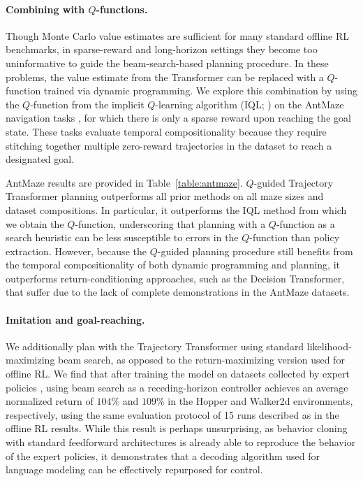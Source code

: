 \paragraph{Combining with $Q$-functions.}
Though Monte Carlo value estimates are sufficient for many standard offline RL benchmarks, in sparse-reward and long-horizon settings they become too uninformative to guide the beam-search-based planning procedure.
In these problems, the value estimate from the Transformer can be replaced with a $Q$-function trained via dynamic programming.
We explore this combination by using the $Q$-function from the implicit $Q$-learning algorithm (IQL; \citealt{kostrikov2021implicit}) on the AntMaze navigation tasks \citep{fu2020d4rl}, for which there is only a sparse reward upon reaching the goal state.
These tasks evaluate temporal compositionality because they require stitching together multiple zero-reward trajectories in the dataset to reach a designated goal.

AntMaze results are provided in Table~\ref{table:antmaze}.
$Q$-guided Trajectory Transformer planning outperforms all prior methods on all maze sizes and dataset compositions.
In particular, it outperforms the IQL method from which we obtain the $Q$-function, underscoring that planning with a $Q$-function as a search heuristic can be less susceptible to errors in the $Q$-function than policy extraction.
However, because the $Q$-guided planning procedure still benefits from the temporal compositionality of both dynamic programming and planning, it outperforms return-conditioning approaches, such as the Decision Transformer, that suffer due to the lack of complete demonstrations in the AntMaze datasets.






\paragraph{Imitation and goal-reaching.}
We additionally plan with the Trajectory Transformer using standard likelihood-maximizing beam search, as opposed to the return-maximizing version used for offline RL.
We find that after training the model on datasets collected by expert policies \citep{fu2020d4rl}, using beam search as a receding-horizon controller achieves an average normalized return of $104\%$ and $109\%$ in the Hopper and Walker2d environments, respectively, using the same evaluation protocol of 15 runs described as in the offline RL results.
While this result is perhaps unsurprising, as behavior cloning with standard feedforward architectures is already able to reproduce the behavior of the expert policies, it demonstrates that a decoding algorithm used for language modeling can be effectively repurposed for control.

